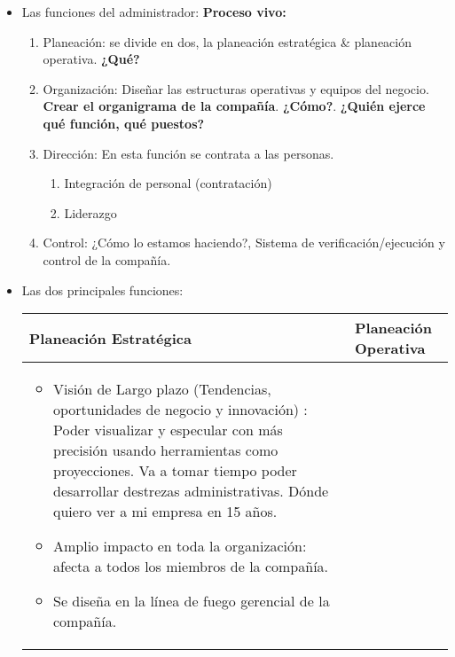 \begin{itemize}
    \item Las funciones del administrador: \textbf{Proceso vivo:}
        \begin{center}
        \end{center}
        \begin{enumerate}
            \item Planeación: se divide en dos, la planeación estratégica \& planeación operativa. \textbf{¿Qué?}
            \item Organización: Diseñar las estructuras operativas y equipos del negocio. \textbf{Crear el organigrama de la compañía}. \textbf{¿Cómo?}. \textbf{¿Quién ejerce qué función, qué puestos?}
            \item Dirección: En esta función se contrata a las personas.
                \begin{enumerate}
                    \item Integración de personal (contratación)
                    \item Liderazgo
                \end{enumerate}
            \item Control: ¿Cómo lo estamos haciendo?, Sistema de verificación/ejecución y control de la compañía.
        \end{enumerate}
    
    \item Las dos principales funciones:
        \begin{center}
           \begin{tabular}{| p{5cm} | p{5cm} | }
               \hline
                    Planeación Estratégica & Planeación Operativa    \\
               \hline
                    \begin{itemize}
                        \item Visión de Largo plazo (Tendencias, oportunidades de negocio y innovación) : Poder visualizar y especular con más precisión usando herramientas como proyecciones. Va a tomar tiempo poder desarrollar destrezas administrativas. Dónde quiero ver a mi empresa en 15 años.
                        \item Amplio impacto en toda la organización: afecta a todos los miembros de la compañía.
                        \item Se diseña en la línea de fuego gerencial de la compañía.
                    \end{itemize} & 


\end{tabular}
\end{center}
\end{itemize}
